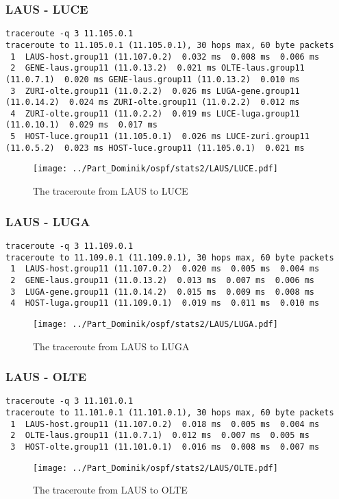 \subsubsection{LAUS - LUCE}
\begin{lstlisting}
traceroute -q 3 11.105.0.1
traceroute to 11.105.0.1 (11.105.0.1), 30 hops max, 60 byte packets
 1  LAUS-host.group11 (11.107.0.2)  0.032 ms  0.008 ms  0.006 ms
 2  GENE-laus.group11 (11.0.13.2)  0.021 ms OLTE-laus.group11 (11.0.7.1)  0.020 ms GENE-laus.group11 (11.0.13.2)  0.010 ms
 3  ZURI-olte.group11 (11.0.2.2)  0.026 ms LUGA-gene.group11 (11.0.14.2)  0.024 ms ZURI-olte.group11 (11.0.2.2)  0.012 ms
 4  ZURI-olte.group11 (11.0.2.2)  0.019 ms LUCE-luga.group11 (11.0.10.1)  0.029 ms  0.017 ms
 5  HOST-luce.group11 (11.105.0.1)  0.026 ms LUCE-zuri.group11 (11.0.5.2)  0.023 ms HOST-luce.group11 (11.105.0.1)  0.021 ms
\end{lstlisting}
\begin{figure}[H]
\centering
\texttt{[image: ../Part\_Dominik/ospf/stats2/LAUS/LUCE.pdf]}
\caption{The traceroute from LAUS to LUCE}
\end{figure}
\clearpage
\subsubsection{LAUS - LUGA}
\begin{lstlisting}
traceroute -q 3 11.109.0.1
traceroute to 11.109.0.1 (11.109.0.1), 30 hops max, 60 byte packets
 1  LAUS-host.group11 (11.107.0.2)  0.020 ms  0.005 ms  0.004 ms
 2  GENE-laus.group11 (11.0.13.2)  0.013 ms  0.007 ms  0.006 ms
 3  LUGA-gene.group11 (11.0.14.2)  0.015 ms  0.009 ms  0.008 ms
 4  HOST-luga.group11 (11.109.0.1)  0.019 ms  0.011 ms  0.010 ms
\end{lstlisting}
\begin{figure}[H]
\centering
\texttt{[image: ../Part\_Dominik/ospf/stats2/LAUS/LUGA.pdf]}
\caption{The traceroute from LAUS to LUGA}
\end{figure}
\clearpage
\subsubsection{LAUS - OLTE}
\begin{lstlisting}
traceroute -q 3 11.101.0.1
traceroute to 11.101.0.1 (11.101.0.1), 30 hops max, 60 byte packets
 1  LAUS-host.group11 (11.107.0.2)  0.018 ms  0.005 ms  0.004 ms
 2  OLTE-laus.group11 (11.0.7.1)  0.012 ms  0.007 ms  0.005 ms
 3  HOST-olte.group11 (11.101.0.1)  0.016 ms  0.008 ms  0.007 ms
\end{lstlisting}
\begin{figure}[H]
\centering
\texttt{[image: ../Part\_Dominik/ospf/stats2/LAUS/OLTE.pdf]}
\caption{The traceroute from LAUS to OLTE}
\end{figure}
\clearpage
